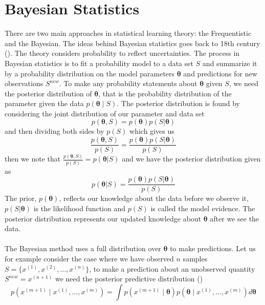 \section{Bayesian Statistics}
There are two main approaches in statistical learning theory: the Frequentistic and the Bayesian. The ideas behind Bayesian statistics goes back to 18th century (\cite{stigler1986history}). The theory considers probability to reflect uncertainties. The process in Bayesian statistics is to fit a probability model to a data set $S$ and summarize it by a probability distribution on the model parameters $\boldsymbol{\theta}$ and predictions for new observations $S^{new}$. To make any probability statements about $\boldsymbol{\theta}$ given $S$, we need the posterior distribution of $\boldsymbol{\theta}$, that is the probability distribution of the parameter given the data $p(\boldsymbol{\theta} \mid S)$. The posterior distribution is found by considering the joint distribution of our parameter and data set
\begin{equation*}
    p(\boldsymbol{\theta},S)=p(\boldsymbol{\theta})p(S|\boldsymbol{\theta})
\end{equation*}
and then dividing both sides by $p(S)$ which gives us
\begin{equation*}
         \frac{p(\boldsymbol{\theta},S)}{p(S)}=\frac{p(\boldsymbol{\theta})p(S|\boldsymbol{\theta})}{p(S)}
\end{equation*}
then we note that $\frac{p(\boldsymbol{\theta},S)}{p(S)}=p(\boldsymbol{\theta}|S)$ and we have the posterior distribution given as 
\begin{equation*}
         p(\boldsymbol{\theta}|S)=\frac{p(\boldsymbol{\theta})p(S|\boldsymbol{\theta})}{p(S)}
\end{equation*}
The prior, $p(\boldsymbol{\theta})$, reflects our knowledge about the data before we observe it, $p(S|\boldsymbol{\theta})$ is the likelihood function and $p(S)$ is called the model evidence. The posterior distribution represents our updated knowledge about $\boldsymbol{\theta}$ after we see the data. \\
\\
The Bayesian method uses a full distribution over $\boldsymbol{\theta}$ to make predictions. Let us for example consider the case where we have observed $n$ samples $S=\{x^{(1)},x^{(2)},\ldots,x^{(n)}\}$, to make a prediction about an unobserved quantity $S^{new}=x^{(n+1)}$ we need the 
posterior predictive distribution (\cite{gelmanbda04})
\begin{equation*}
p\left(x^{(m+1)} \mid x^{(1)}, \ldots, x^{(m)}\right)=\int p\left(x^{(m+1)} \mid \boldsymbol{\theta}\right) p\left(\boldsymbol{\theta} \mid x^{(1)}, \ldots, x^{(m)}\right) d \boldsymbol{\theta}
\end{equation*}
